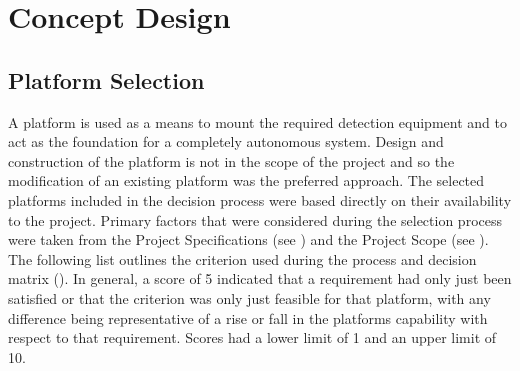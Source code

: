 \documentclass[main.tex]{subfiles}
\begin{document}
\chapter{Concept Design}

\section{Platform Selection}
A platform is used as a means to mount the required detection equipment and to act as the foundation for a completely autonomous system.  Design and construction of the platform is not in the scope of the project and so the modification of an existing platform was the preferred approach. The selected platforms included in the decision process were based directly on their availability to the project. Primary factors that were considered during the selection process were taken from the Project Specifications (see ) and the Project Scope (see ). The following list outlines the criterion used during the process and decision matrix (). In general, a score of 5 indicated that a requirement had only just been satisfied or that the criterion was only just feasible for that platform, with any difference being representative of a rise or fall in the platforms capability with respect to that requirement. Scores had a lower limit of 1 and an upper limit of 10.
\end{document}
